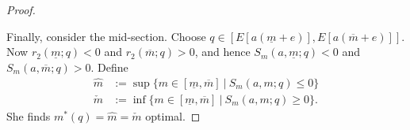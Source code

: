 \documentclass[12pt]{article}
\begin{document}
\begin{proof}
\begin{enumerate}
\end{enumerate}
Finally, consider the mid-section. Choose $q\in[E[a(\underline{m}+e)],E[a(\overline{m}+e)]]$. Now $r_{2}(\underline{m};q)<0$ and $r_{2}(\overline{m};q)>0$, and hence $S_{m}(a,\underline{m};q)<0$ and $S_{m}(a,\overline{m};q)>0$. Define
\begin{align}
\hat{m}&:=\sup\{m\in[\underline{m},\overline{m}]\:|\:S_{m}(a,m;q)\leq0\}\\
\check{m}&:=\inf\{m\in[\underline{m},\overline{m}]\:|\:S_{m}(a,m;q)\geq0\}.
\end{align}
She finds $m^{*}(q)=\hat{m}=\check{m}$ optimal.
\end{proof}
\end{document}

